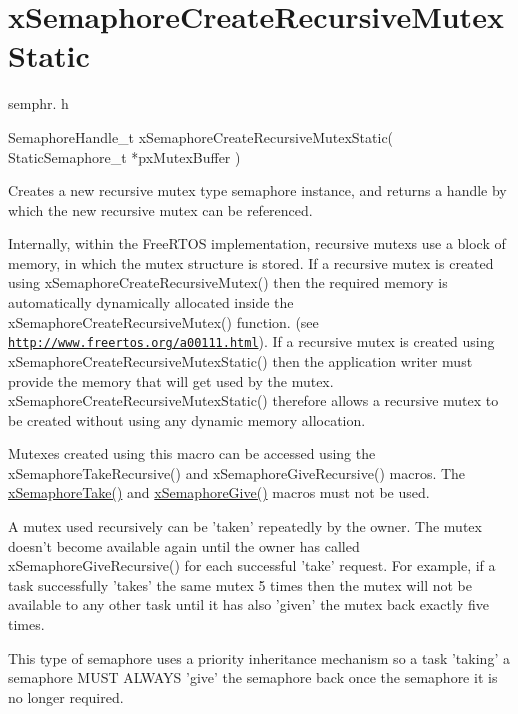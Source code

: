 \hypertarget{group__xSemaphoreCreateRecursiveMutexStatic}{\section{x\-Semaphore\-Create\-Recursive\-Mutex\-Static}
\label{group__xSemaphoreCreateRecursiveMutexStatic}
}
semphr. h 
\begin{DoxyPre}SemaphoreHandle\_t xSemaphoreCreateRecursiveMutexStatic( StaticSemaphore\_t *pxMutexBuffer )\end{DoxyPre}


Creates a new recursive mutex type semaphore instance, and returns a handle by which the new recursive mutex can be referenced.

Internally, within the Free\-R\-T\-O\-S implementation, recursive mutexs use a block of memory, in which the mutex structure is stored. If a recursive mutex is created using x\-Semaphore\-Create\-Recursive\-Mutex() then the required memory is automatically dynamically allocated inside the x\-Semaphore\-Create\-Recursive\-Mutex() function. (see \href{http://www.freertos.org/a00111.html}{\tt http\-://www.\-freertos.\-org/a00111.\-html}). If a recursive mutex is created using x\-Semaphore\-Create\-Recursive\-Mutex\-Static() then the application writer must provide the memory that will get used by the mutex. x\-Semaphore\-Create\-Recursive\-Mutex\-Static() therefore allows a recursive mutex to be created without using any dynamic memory allocation.

Mutexes created using this macro can be accessed using the x\-Semaphore\-Take\-Recursive() and x\-Semaphore\-Give\-Recursive() macros. The \hyperlink{semphr_8h_af116e436d2a5ae5bd72dbade2b5ea930}{x\-Semaphore\-Take()} and \hyperlink{semphr_8h_aae55761cabfa9bf85c8f4430f78c0953}{x\-Semaphore\-Give()} macros must not be used.

A mutex used recursively can be 'taken' repeatedly by the owner. The mutex doesn't become available again until the owner has called x\-Semaphore\-Give\-Recursive() for each successful 'take' request. For example, if a task successfully 'takes' the same mutex 5 times then the mutex will not be available to any other task until it has also 'given' the mutex back exactly five times.

This type of semaphore uses a priority inheritance mechanism so a task 'taking' a semaphore M\-U\-S\-T A\-L\-W\-A\-Y\-S 'give' the semaphore back once the semaphore it is no longer required.

